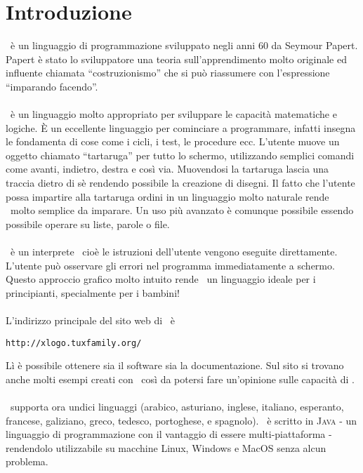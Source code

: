 \chapter{Introduzione}
\logo\ \`e un linguaggio di programmazione sviluppato negli anni 60 da Seymour Papert. Papert \`e stato lo sviluppatore una teoria sull'apprendimento molto originale ed influente chiamata ``costruzionismo'' che si pu\`o riassumere con l'espressione ``imparando facendo''.\\ \\
\logo\ \`e un linguaggio molto appropriato per sviluppare le capacit\`a matematiche e logiche. \`E un eccellente linguaggio per cominciare a programmare, infatti insegna le fondamenta di cose come i cicli, i test, le procedure ecc. L'utente muove un oggetto chiamato ``tartaruga'' per tutto lo schermo, utilizzando semplici comandi come avanti, indietro, destra e cos\`i via. Muovendosi la tartaruga lascia una traccia dietro di s\`e rendendo possibile la creazione di disegni. Il fatto che l'utente possa impartire alla tartaruga ordini in un linguaggio molto naturale rende  \logo\ molto semplice da imparare. Un uso pi\`u avanzato \`e comunque possibile essendo possibile operare su liste, parole o file.\\ \\
\xlogo\ \`e un interprete \logo\, cioè le istruzioni dell'utente vengono eseguite direttamente. L'utente può osservare gli errori nel programma immediatamente a schermo. Questo approccio grafico molto intuito rende \logo\ un linguaggio ideale per i principianti, specialmente per i bambini!\\ \\
L'indirizzo principale del sito web di \xlogo\ è
\begin{center}
\texttt{http://xlogo.tuxfamily.org/}
\end{center}
Lì è possibile ottenere sia il software sia la documentazione. Sul sito si trovano anche molti esempi creati con \xlogo\ così da potersi fare un'opinione sulle capacità di \xlogo.\\ \\
\xlogo\ supporta ora undici linguaggi (arabico, asturiano, inglese, italiano, esperanto, francese, galiziano, greco, tedesco, portoghese, e spagnolo). \xlogo\ è scritto in \textsc{Java} - un linguaggio di programmazione con il vantaggio di essere multi-piattaforma - rendendolo utilizzabile su macchine Linux, Windows e MacOS senza alcun problema.\\ \\
